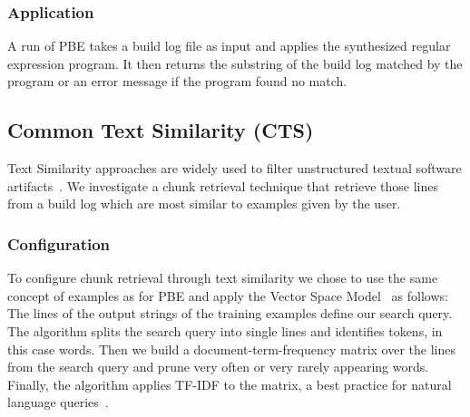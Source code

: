 \subsubsection{Application}
A run of PBE takes a build log file as input and applies the
synthesized regular expression program.
It then returns the substring
of the build log matched by the program or an error message if the
program found no match.



\subsection{Common Text Similarity (CTS)}
Text Similarity approaches are widely used to filter unstructured
textual software artifacts~\cite{runeson2007detection,
marcus2005recovery,antoniol2002recovering,mccarey2006recommending}.
We investigate a chunk retrieval technique that
retrieve those lines from a build log which are most
similar to examples given by the user.

\subsubsection{Configuration}
To configure chunk retrieval through text similarity we chose to use
the same concept of examples as for PBE
and apply the Vector Space Model~\cite{schutze2008introduction}
as follows:
The lines of the output strings of the training examples define our
search query.
The algorithm splits the search query into single lines and
identifies tokens, in this case words.
Then we build a
document-term-frequency matrix over the lines from the search query
and prune very often or very rarely appearing words.
Finally, the
algorithm applies TF-IDF to the matrix, a best practice for natural
language queries~\cite{lee1997document}.

